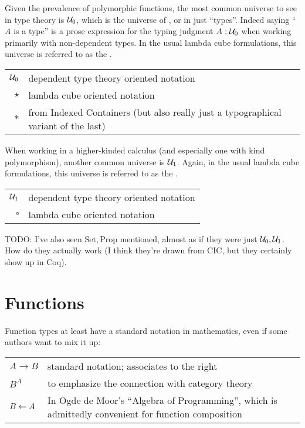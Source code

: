\documentclass[11pt]{article} %
\theoremstyle{definition}
\theoremstyle{remark}
\begin{document}
Given the prevalence of polymorphic functions, the most common universe to see in type theory is $\mathcal{U}_0$, which is the universe of , or in \SystemFw{} just ``types''.
Indeed saying ``$A$ is a type'' is a prose expression for the typing judgment $A : \mathcal{U}_0$ when working primarily with non-dependent types.
In the usual lambda cube formulations, this universe is referred to as the .
\begin{center}
\renewcommand{\arraystretch}{1.2}
\begin{tabular}{rp{10cm}}
$\mathcal{U}_0$ & dependent type theory oriented notation \\
$\star$ & lambda cube oriented notation \\
$*$ & from Indexed Containers (but also really just a typographical variant of the last) \\
\end{tabular}
\end{center}

When working in a higher-kinded calculus (and especially one with kind polymorphism), another common universe is $\mathcal{U}_1$.
Again, in the usual lambda cube formulations, this universe is referred to as the .
\begin{center}
\renewcommand{\arraystretch}{1.2}
\begin{tabular}{rp{10cm}}
$\mathcal{U}_1$ & dependent type theory oriented notation \\
$\square$ & lambda cube oriented notation \\
\end{tabular}
\end{center}

TODO:
I've also seen $\mathrm{Set}, \mathrm{Prop}$ mentioned, almost as if they were just $\mathcal{U}_0, \mathcal{U}_1$.
How do they actually work (I think they're drawn from CIC, but they certainly show up in Coq).


\section{Functions}
\label{sec:function-types}

Function types at least have a standard notation in mathematics, even if some authors want to mix it up:
\begin{center}
\renewcommand{\arraystretch}{1.2}
\begin{tabular}{lp{10cm}}
$A \to B$ & standard notation; associates to the right \\
$B^A$ & to emphasize the connection with category theory \\
$B \leftarrow A$ & In Ogde de Moor's ``Algebra of Programming'', which is admittedly convenient for function composition \\
\end{tabular}
\end{center}
\end{document}
